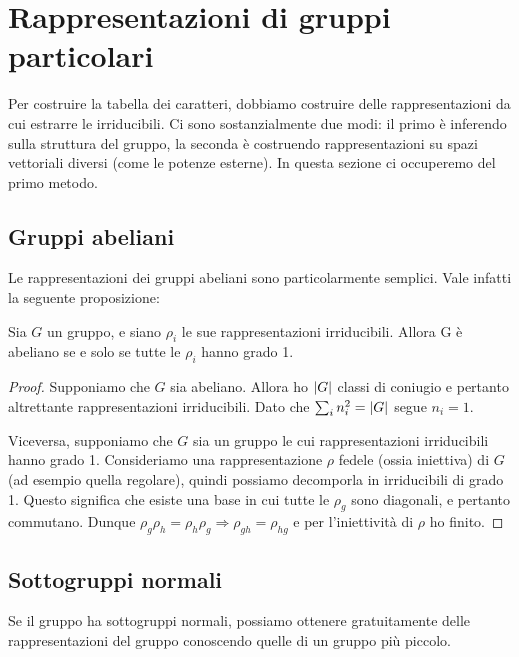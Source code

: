 \section{Rappresentazioni di gruppi particolari}
	Per costruire la tabella dei caratteri, dobbiamo costruire delle rappresentazioni da cui estrarre le irriducibili. Ci sono sostanzialmente due modi: il primo è inferendo sulla struttura del gruppo, la seconda è costruendo rappresentazioni su spazi vettoriali diversi (come le potenze esterne). In questa sezione ci occuperemo del primo metodo.
	
	\subsection{Gruppi abeliani}
		Le rappresentazioni dei gruppi abeliani sono particolarmente semplici. Vale infatti la seguente proposizione:
		\begin{myprop}
			Sia $G$ un gruppo, e siano $\rho_i$ le sue rappresentazioni irriducibili. Allora G è abeliano se e solo se tutte le $\rho_i$ hanno grado 1.
		\end{myprop}
		
		\begin{proof}
			Supponiamo che $G$ sia abeliano. Allora ho $\left|G\right|$ classi di coniugio e pertanto altrettante rappresentazioni irriducibili. Dato che $\sum_i n_i^2 = \left|G\right|$ segue $n_i = 1$.
			
			Viceversa, supponiamo che $G$ sia un gruppo le cui rappresentazioni irriducibili hanno grado 1. Consideriamo una rappresentazione $\rho$ fedele (ossia iniettiva) di $G$ (ad esempio quella regolare), quindi possiamo decomporla in irriducibili di grado 1. Questo significa che esiste una base in cui tutte le $\rho_g$ sono diagonali, e pertanto commutano. Dunque $\rho_g\rho_h = \rho_h\rho_g \Rightarrow \rho_{gh} = \rho_{hg}$ e per l'iniettività di $\rho$ ho finito.
		\end{proof}
	\subsection{Sottogruppi normali}
		Se il gruppo ha sottogruppi normali, possiamo ottenere gratuitamente delle rappresentazioni del gruppo conoscendo quelle di un gruppo più piccolo.
		
